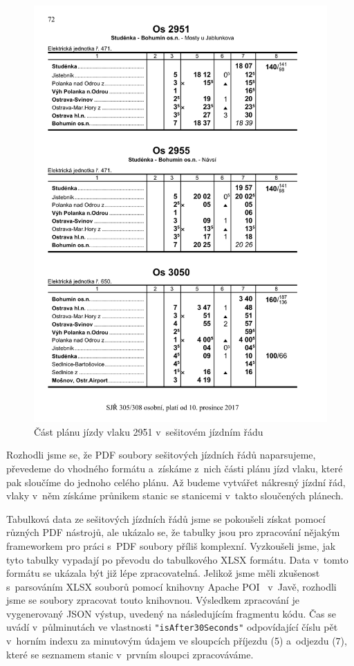 \begin{figure}[!hbt]
	\centering
	\includegraphics[width=\textwidth]{../img/kap6_sjr_plan_jizdy}
	\caption{Část plánu jízdy vlaku 2951 v~sešitovém jízdním řádu}
	\label{fig:kap6:sjr_plan_jizdy}
\end{figure}

Rozhodli jsme se, že PDF soubory sešitových jízdních řádů naparsujeme, převedeme do vhodného formátu a~získáme z~nich části plánu jízd vlaku, které pak sloučíme do jednoho celého plánu. Až budeme vytvářet nákresný jízdní řád, vlaky v~něm získáme průnikem stanic se stanicemi v~takto sloučených plánech.

Tabulková data ze sešitových jízdních řádů jsme se pokoušeli získat pomocí různých PDF nástrojů, ale ukázalo se, že tabulky jsou pro zpracování nějakým frameworkem pro práci s~PDF soubory příliš komplexní. Vyzkoušeli jsme, jak tyto tabulky vypadají po převodu do tabulkového XLSX formátu. Data v~tomto formátu se ukázala být již lépe zpracovatelná. Jelikož jsme měli zkušenost s~parsováním XLSX souborů pomocí knihovny Apache POI~\cite{Apache_POI} v~Javě, rozhodli jsme se soubory zpracovat touto knihovnou. Výsledkem zpracování je vygenerovaný JSON výstup, uvedený na následujícím fragmentu kódu. Čas se uvádí v~půlminutách ve vlastnosti \texttt{"isAfter30Seconds"} odpovídající číslu pět v~horním indexu za minutovým údajem ve sloupcích příjezdu (5) a~odjezdu (7), které se seznamem stanic v~prvním sloupci zpracováváme.

